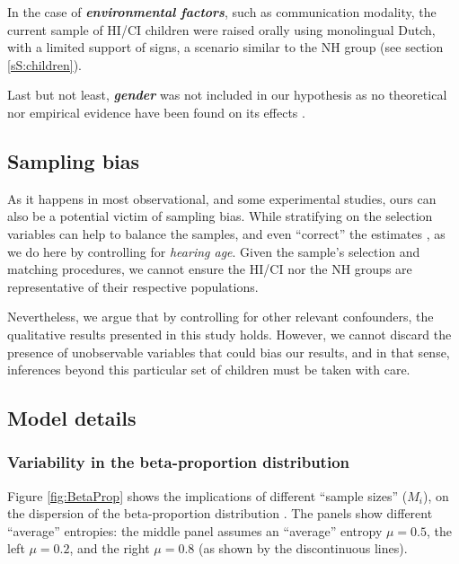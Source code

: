 In the case of \textbf{\textit{environmental factors}}, such as communication modality, the current sample of HI/CI children were raised orally using monolingual Dutch, with a limited support of signs, a scenario similar to the NH group (see section \ref{sS:children}).

Last but not least, \textbf{\textit{gender}} was not included in our hypothesis as no theoretical nor empirical evidence have been found on its effects \cite{Boonen_et_al_2021}.
%
%
\subsection{Sampling bias} \label{sSA:sampling_bias}
%
As it happens in most observational, and some experimental studies, ours can also be a potential victim of sampling bias. While stratifying on the selection variables can help to balance the samples, and even ``correct'' the estimates \cite{Cinelli_et_al_2021, Deffner_et_al_2022}, as we do here by controlling for \textit{hearing age}. Given the sample's selection and matching procedures, we cannot ensure the HI/CI nor the NH groups are representative of their respective populations. 

Nevertheless, we argue that by controlling for other relevant confounders, the qualitative results presented in this study holds. However, we cannot discard the presence of unobservable variables that could bias our results, and in that sense, inferences beyond this particular set of children must be taken with care.
%
%
\subsection{Model details} \label{sSA:model_details}
%
\subsubsection{Variability in the beta-proportion distribution} \label{ssSA:model_variability}
%
Figure \ref{fig:BetaProp} shows the implications of different ``sample sizes'' ($M_{i}$), on the dispersion of the beta-proportion distribution \cite{Kruschke_2015}. The panels show different ``average'' entropies: the middle panel assumes an ``average'' entropy $\mu=0.5$, the left $\mu=0.2$, and the right $\mu=0.8$ (as shown by the discontinuous lines).

